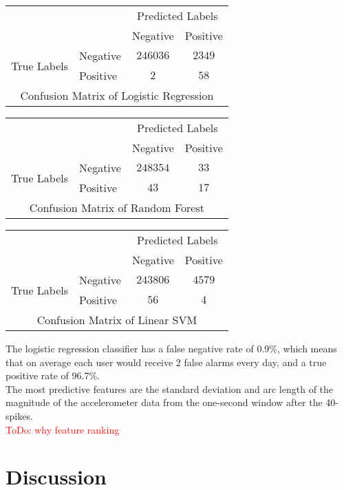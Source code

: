 \begin{tabular}{l|l|c|c|}
\multicolumn{2}{c}{} &\multicolumn{2}{c}{Predicted Labels}\\
\cline{3-4}
\multicolumn{2}{c|}{}&Negative&Positive \\
\cline{2-4}
\multirow{2}{*}{True Labels}& Negative  & $246036$ & $2349$ \\
\cline{2-4}
& Positive & $2$ & $58$ \\
\cline{2-4}
\multicolumn{4}{c}{Confusion Matrix of Logistic Regression} 
\end{tabular}

\begin{tabular}{l|l|c|c|}
\multicolumn{2}{c}{} &\multicolumn{2}{c}{Predicted Labels}\\
\cline{3-4}
\multicolumn{2}{c|}{}&Negative&Positive \\
\cline{2-4}
\multirow{2}{*}{True Labels}& Negative  & $248354$ & $33$ \\
\cline{2-4}
& Positive & $43$ & $17$ \\
\cline{2-4}
\multicolumn{4}{c}{Confusion Matrix of Random Forest} 
\end{tabular}

\begin{tabular}{l|l|c|c|}
\multicolumn{2}{c}{} &\multicolumn{2}{c}{Predicted Labels}\\
\cline{3-4}
\multicolumn{2}{c|}{}&Negative&Positive \\
\cline{2-4}
\multirow{2}{*}{True Labels}& Negative  & $243806$ & $4579$ \\
\cline{2-4}
& Positive & $56$ & $4$ \\
\cline{2-4}
\multicolumn{4}{c}{Confusion Matrix of Linear SVM} 
\end{tabular}

The logistic regression classifier has a false negative rate of 0.9\%, which means that on average each user would receive 2 false alarms every day, and a true positive rate of 96.7\%. \\
The most predictive features are the standard deviation and arc length of the magnitude of the accelerometer data from the one-second window after the 40-spikes. \\
\textcolor{red}{ToDo: why feature ranking} \\

\section{Discussion}






